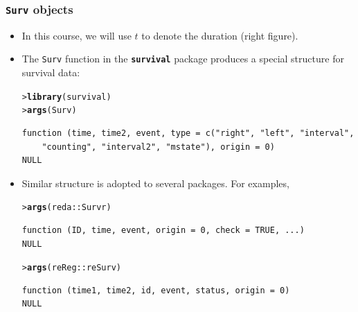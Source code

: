 \documentclass[10pt]{beamer}\usepackage[]{graphicx}\usepackage[]{color}
\makeatletter
\newcommand{\hlopt}[1]{\textcolor[rgb]{0,0,0}{#1}}%
\newcommand{\hlstd}[1]{\textcolor[rgb]{0.345,0.345,0.345}{#1}}%
\newcommand{\hlkwd}[1]{\textcolor[rgb]{0.737,0.353,0.396}{\textbf{#1}}}%
\newenvironment{kframe}{%
 \def\at@end@of@kframe{}%
 \ifinner\ifhmode%
  \def\at@end@of@kframe{\end{minipage}}%
  \begin{minipage}{\columnwidth}%
 \fi\fi%
 \def\FrameCommand##1{\hskip\@totalleftmargin \hskip-\fboxsep
 \colorbox{shadecolor}{##1}\hskip-\fboxsep
     \hskip-\linewidth \hskip-\@totalleftmargin \hskip\columnwidth}%
 \MakeFramed {\advance\hsize-\width
   \@totalleftmargin\z@ \linewidth\hsize
   \@setminipage}}%
 {\par\unskip\endMakeFramed%
 \at@end@of@kframe}
\newenvironment{knitrout}{}{} %
\renewenvironment{knitrout}{\setlength{\topsep}{-.2mm}}{}
\newcommand{\pkg}[1]{{\textbf{\texttt{#1}}}}
\makeatother
\begin{document}
\begin{frame}[fragile]
  \frametitle{\texttt{Surv} objects}
  \begin{itemize}
  \item In this course, we will use $t$ to denote the duration (right figure).
  \item The \texttt{Surv} function in the \pkg{survival} package produces a special structure for survival data:
\begin{knitrout}\scriptsize
{}\color{fgcolor}\begin{kframe}
\begin{alltt}
\hlstd{> }\hlkwd{library}\hlstd{(survival)}
\hlstd{> }\hlkwd{args}\hlstd{(Surv)}
\end{alltt}
\begin{verbatim}
function (time, time2, event, type = c("right", "left", "interval", 
    "counting", "interval2", "mstate"), origin = 0) 
NULL
\end{verbatim}
\end{kframe}
\end{knitrout}
  \item Similar structure is adopted to several packages. 
    For examples,
\begin{knitrout}\scriptsize
{}\color{fgcolor}\begin{kframe}
\begin{alltt}
\hlstd{> }\hlkwd{args}\hlstd{(reda}\hlopt{::}\hlstd{Survr)}
\end{alltt}
\begin{verbatim}
function (ID, time, event, origin = 0, check = TRUE, ...) 
NULL
\end{verbatim}
\begin{alltt}
\hlstd{> }\hlkwd{args}\hlstd{(reReg}\hlopt{::}\hlstd{reSurv)}
\end{alltt}
\begin{verbatim}
function (time1, time2, id, event, status, origin = 0) 
NULL
\end{verbatim}
\end{kframe}
\end{knitrout}
  \end{itemize}
\end{frame}
\end{document}

